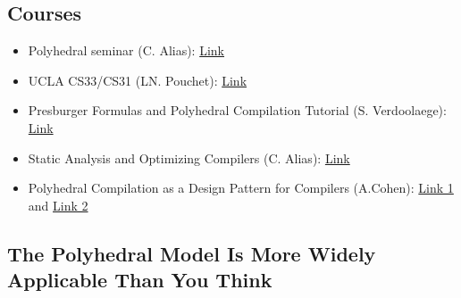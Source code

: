 \documentclass[a4paper, 11pt]{article}
\begin{document}
\subsection{Courses}
\begin{itemize}
    \item Polyhedral seminar (C. Alias): \href{https://gitlab.inria.fr/alias/polyhedral-seminar}{Link}
    \item UCLA CS33/CS31 (LN. Pouchet): \href{https://web.cs.ucla.edu/~pouchet/index.html#lectures}{Link}
    \item Presburger Formulas and Polyhedral Compilation Tutorial (S. Verdoolaege): \href{https://lirias.kuleuven.be/bitstream/123456789/523109/3/polycomp-tutorial-v0.02.pdf}{Link}
    \item Static Analysis and Optimizing Compilers (C. Alias): \href{https://gitlab.inria.fr/alias/cours-m2-cr14}{Link}
    \item Polyhedral Compilation as a Design Pattern for Compilers (A.Cohen): \href{https://www.youtube.com/watch?v=mt6pIpt5Wk0}{Link 1} and \href{https://www.youtube.com/watch?v=3TNT5rFVTUY}{Link 2}
\end{itemize}

\subsection{The Polyhedral Model Is More Widely Applicable Than You Think}
\cite{Benabderrahmane2010ThePM}
\end{document}
